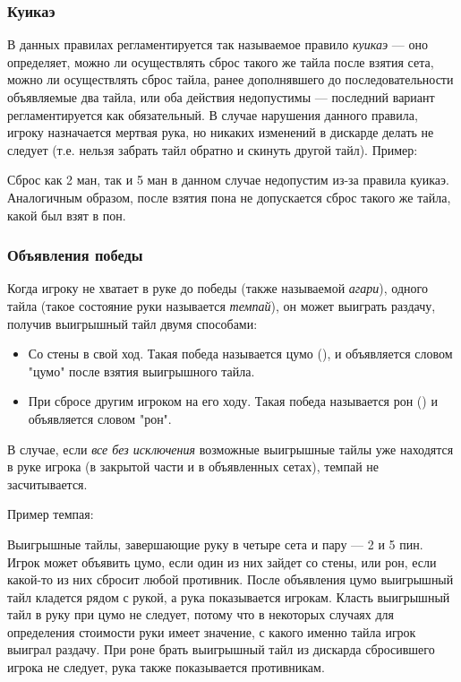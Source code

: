 \subsubsection{Куикаэ}

В данных правилах регламентируется так называемое правило \textit{куикаэ} --- оно определяет, можно ли осуществлять сброс такого же тайла после взятия сета, можно ли осуществлять сброс тайла, ранее дополнявшего до последовательности объявляемые два тайла, или оба действия недопустимы --- последний вариант регламентируется как обязательный. В случае нарушения данного правила, игроку назначается мертвая рука, но никаких изменений в дискарде делать не следует (т.е. нельзя забрать тайл обратно и скинуть другой тайл). Пример:

 \hfill {}

Сброс как 2 ман, так и 5 ман в данном случае недопустим из-за правила куикаэ. Аналогичным образом, после взятия пона не допускается сброс такого же тайла, какой был взят в пон.

\subsubsection{Объявления победы}

Когда игроку не хватает в руке до победы (также называемой \textit{агари}), одного тайла (такое состояние руки называется \textit{темпай}), он может выиграть раздачу, получив выигрышный тайл двумя способами:

\begin{itemize}
	\item Со стены в свой ход. Такая победа называется цумо (), и объявляется словом "цумо" после взятия выигрышного тайла.
	\item При сбросе другим игроком на его ходу. Такая победа называется рон () и объявляется словом "рон".
\end{itemize}

В случае, если \textit{все без исключения} возможные выигрышные тайлы уже находятся в руке игрока (в закрытой части и в объявленных сетах), темпай не засчитывается.

Пример темпая:

 \hfill {}

Выигрышные тайлы, завершающие руку в четыре сета и пару --- 2 и 5 пин. Игрок может объявить цумо, если один из них зайдет со стены, или рон, если какой-то из них сбросит любой противник. После объявления цумо выигрышный тайл кладется рядом с рукой, а рука показывается игрокам. Класть выигрышный тайл в руку при цумо не следует, потому что в некоторых случаях для определения стоимости руки имеет значение, с какого именно тайла игрок выиграл раздачу. При роне брать выигрышный тайл из дискарда сбросившего игрока не следует, рука также показывается противникам.

